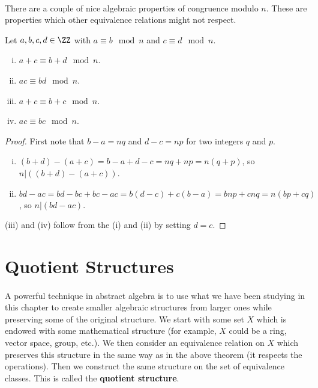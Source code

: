 \documentclass[../abstract_algebra.tex]{subfiles}
\begin{document}
        \paragraph{}
        There are a couple of nice algebraic properties of congruence modulo $n$.
        These are properties which other equivalence relations might not respect.
        \begin{theorem}\label{congruence-properties}
            Let $a,b,c,d\in\ZZ$ with $a\equiv b\mod n$ and $c\equiv d\mod n$.
            \begin{enumerate}[(i)]
                \item $a+c\equiv b+d\mod n$.
                \item $ac\equiv bd\mod n$.
                \item $a+c\equiv b+c\mod n$.
                \item $ac\equiv bc\mod n$.
            \end{enumerate}
        \end{theorem}
        \begin{proof}
            First note that $b-a=nq$ and $d-c=np$ for two integers $q$ and $p$.
            \begin{enumerate}[(i)]
                \item $(b+d)-(a+c)=b-a+d-c=nq+np=n(q+p)$, so $n|((b+d)-(a+c))$.
                \item $bd-ac=bd-bc+bc-ac=b(d-c)+c(b-a)=bnp+cnq=n(bp+cq)$, so $n|(bd-ac)$.
            \end{enumerate}
            (iii) and (iv) follow from the (i) and (ii) by setting $d=c$.
        \end{proof}

    \section{Quotient Structures}
        \paragraph{}
        A powerful technique in abstract algebra is to use what we have been studying in this chapter to create smaller algebraic structures from larger ones while preserving some of the original structure.
        We start with some set $X$ which is endowed with some mathematical structure (for example, $X$ could be a ring, vector space, group, etc.).
        We then consider an equivalence relation on $X$ which preserves this structure in the same way as in the above theorem (it respects the operations).
        Then we construct the same structure on the set of equivalence classes. This is called the \textbf{quotient structure}.
\end{document}
